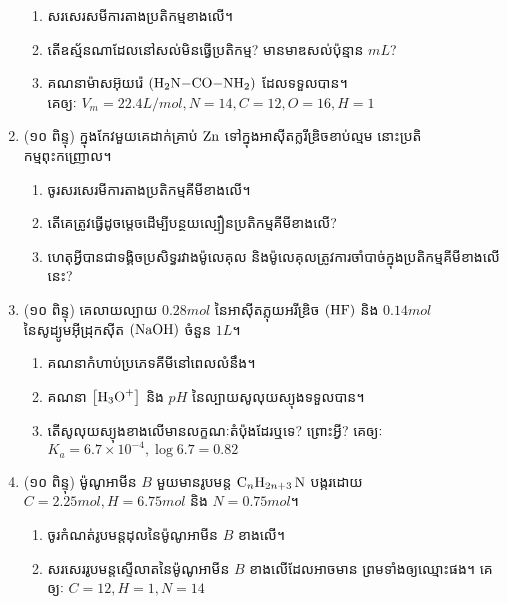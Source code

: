 \documentclass{officialexam}
\begin{document}
\begin{enumerate}[m]
	\begin{enumerate}[k]
		\item សរសេរសមីការតាងប្រតិកម្មខាងលើ។
		\item តើឧស្ម័នណាដែលនៅសល់មិនធ្វើប្រតិកម្ម? មានមាឌសល់ប៉ុន្មាន $mL$?
		\item គណនាម៉ាសអ៊ុយរ៉េ $\left(\ce{H2N-CO-NH2}\right)$ ដែលទទួលបាន។\\
		គេឲ្យៈ $V_m=22.4L/mol, N=14, C=12, O=16, H=1$
	\end{enumerate}
	\item {\color{khtug}\kml (១០ ពិន្ទុ)} ក្នុងកែវមួយគេដាក់គ្រាប់ $\ce{Zn}$ ទៅក្នុងអាសុីតក្លរីឌ្រិចខាប់ល្មម នោះប្រតិកម្មពុះកញ្រោល។
	\begin{enumerate}[k]
		\item ចូរសរសេរមីការតាងប្រតិកម្មគីមីខាងលើ។
		\item តើគេត្រូវធ្វើដូចម្តេចដើម្បីបន្ថយល្បឿនប្រតិកម្មគីមីខាងលើ?
		\item ហេតុអ្វីបានជាទង្គិចប្រសិទ្ធរវាងម៉ូលេគុល និងម៉ូលេគុលត្រូវការចាំបាច់ក្នុងប្រតិកម្មគីមីខាងលើនេះ?
	\end{enumerate}
	\item {\color{khtug}\kml (១០ ពិន្ទុ)} គេលាយល្បាយ $0.28mol$ នៃអាសុីតភ្លុយអរីឌ្រិច $\left(\ce{HF}\right)$ និង $0.14mol$ នៃសូដ្យូមអុីដ្រុកសុីត $\left(\ce{NaOH}\right)$ ចំនួន $1L$។
	\begin{enumerate}[k]
		\item គណនាកំហាប់ប្រភេទគីមីនៅពេលលំនឹង។
		\item គណនា $\left[\ce{H3O^{+}}\right]$ និង $pH$ នៃល្បាយសូលុយស្យុងទទួលបាន។
		\item តើសូលុយស្យុងខាងលើមានលក្ខណៈតំប៉ុងដែរឬទេ? ព្រោះអ្វី?
		គេឲ្យៈ $K_{a}=6.7\times10^{-4}, \log6.7=0.82$ 
	\end{enumerate}
	\item {\color{khtug}\kml (១០ ពិន្ទុ)} ម៉ូណូអាមីន $B$ មួយមានរូបមន្ត $\ce{C_{n}H_{2n+3} N}$ បង្ករដោយ $C=2.25mol, H=6.75mol$ និង $N=0.75mol$។
	\begin{enumerate}[k]
		\item ចូរកំណត់រូបមន្តដុលនៃម៉ូណូអាមីន $B$ ខាងលើ។
		\item សរសេររូបមន្តស្ទើលាតនៃម៉ូណូអាមីន $B$ ខាងលើដែលអាចមាន ព្រមទាំងឲ្យឈ្មោះផង។ គេឲ្យៈ $C=12, H=1, N=14$
	\end{enumerate}
\end{enumerate}
\end{document}

